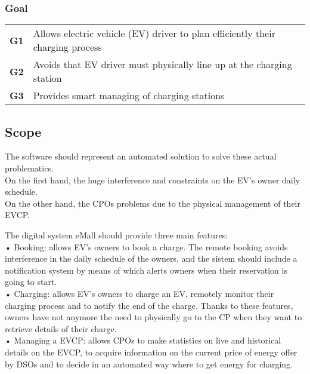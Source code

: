 \subsubsection*{Goal}
\begin{table}[H]
    \begin{tabularx}{\textwidth}{cX}
        \toprule
        \textbf{G1} & Allows electric vehicle (EV) driver to plan efficiently their charging process \\
        \textbf{G2} & Avoids that EV driver must physically line up at the charging station          \\
        \textbf{G3} & Provides smart managing of charging stations                                   \\ \bottomrule
    \end{tabularx}
\end{table}

\subsection{Scope}
The software should represent an automated solution to solve these actual problematics.
\\On the first hand, the huge interference and constraints on the EV's
owner daily schedule.\\
On the other hand, the CPOs problems due to the physical management of their EVCP.

The digital system eMall should provide three main features:
\\• Booking: allows EV's owners to book a charge. The remote booking avoids interference
in the daily schedule of the owners, and the sistem should include a notification
system by means of which alerts owners when their reservation is going to start.
\\• Charging: allows EV's owners to charge an EV, remotely monitor their charging
process and to notify the end of the charge.
Thanks to these features, owners have not anymore the need to
physically go to the CP when they want to retrieve details of their charge.
\\• Managing a EVCP: allows CPOs to make statistics on live and historical details
on the EVCP, to acquire information on the current price of energy offer by
DSOs and to decide in an automated way where to get energy for charging.




